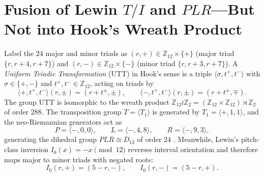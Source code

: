\documentclass[11pt]{amsart}
\numberwithin{equation}{section}
\theoremstyle{plain}
\theoremstyle{definition}\newtheorem{definition}[theorem]{Definition}
\theoremstyle{remark}\newtheorem{remark}[theorem]{Remark}
\newcommand{\Z}{\mathbb{Z}}
\newcommand{\UTT}{\mathrm{UTT}}
\begin{document}
\section{Fusion of Lewin \texorpdfstring{$T/I$}{T/I} and \texorpdfstring{$PLR$}{PLR}---But Not into Hook's Wreath Product}\label{sec:nonfusion}
Label the $24$ major and minor triads as $(r,+)\in\Z_{12}\times\{+\}$ (major triad $\{r,r+4,r+7\}$) and $(r,-)\in\Z_{12}\times\{-\}$ (minor triad $\{r,r+3,r+7\}$). A \emph{Uniform Triadic Transformation} (UTT) in Hook's sense \cite{hook2002} is a triple $\langle\sigma,t^+,t^-\rangle$ with $\sigma\in\{+,-\}$ and $t^+,t^-\in\Z_{12}$, acting on triads by
\begin{equation}\label{eq:utt_act}
\langle +, t^+, t^-\rangle(r,\pm) = (r + t^\pm,\pm), \qquad
\langle -, t^+, t^-\rangle(r,\pm) = (r + t^\pm,\mp).
\end{equation}
The group $\UTT$ is isomorphic to the wreath product $\Z_{12}\wr\Z_2 = (\Z_{12}\times\Z_{12})\rtimes\Z_2$ of order $288$. The transposition group $T=\langle T_1\rangle$ is generated by $T_1 = \langle +,1,1\rangle$, and the neo-Riemannian generators act as
\begin{equation}\label{eq:plr_utt}
P = \langle -,0,0\rangle, \qquad L = \langle -,4,8\rangle, \qquad R = \langle -,9,3\rangle,
\end{equation}
generating the dihedral group $PLR\cong D_{12}$ of order $24$ \cite{cfs2009}. Meanwhile, Lewin's pitch-class inversion $I_0(x)=-x\pmod{12}$ reverses interval orientation and therefore maps major to minor triads with negated roots:
\begin{equation}\label{eq:I0_act}
I_0(r,+) = (5-r,-), \qquad I_0(r,-) = (5-r,+).
\end{equation}
\end{document}
